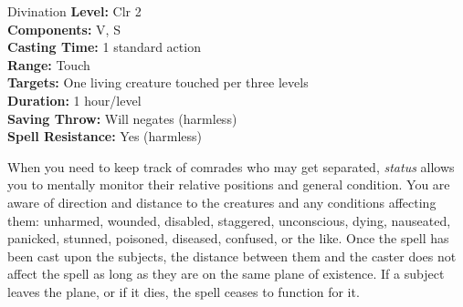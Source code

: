 {Divination}
{
	\textbf{Level:}
	Clr 2\\
	\textbf{Components:}
	V, S\\
	\textbf{Casting Time:}
	1 standard action\\
	\textbf{Range:}
	Touch\\
	\textbf{Targets:}
	One living creature touched per three levels\\
	\textbf{Duration:}
	1 hour/level\\
	\textbf{Saving Throw:}
	Will negates (harmless)\\
	\textbf{Spell Resistance:}
	Yes (harmless)\\
}
{
	When you need to keep track of comrades who may get separated, \emph{status} allows you to mentally monitor their relative positions and general condition. You are aware of direction and distance to the creatures and any conditions affecting them: unharmed, wounded, disabled, staggered, unconscious, dying, nauseated, panicked, stunned, poisoned, diseased, confused, or the like. Once the spell has been cast upon the subjects, the distance between them and the caster does not affect the spell as long as they are on the same plane of existence. If a subject leaves the plane, or if it dies, the spell ceases to function for it.

}
